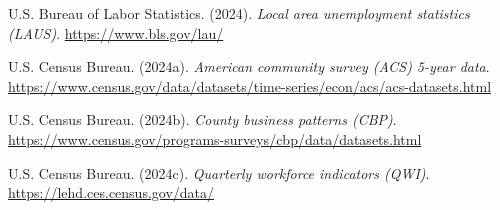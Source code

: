 \documentclass[
]{article}
\newlength{\cslhangindent}
\newenvironment{CSLReferences}[2] %
 {\begin{list}{}{%
  \setlength{\itemindent}{0pt}
  \setlength{\leftmargin}{0pt}
  \setlength{\parsep}{0pt}
  \ifodd #1
   \setlength{\leftmargin}{\cslhangindent}
   \setlength{\itemindent}{-1\cslhangindent}
  \fi
  \setlength{\itemsep}{#2\baselineskip}}}
 {\end{list}}
\begin{document}
\begin{CSLReferences}{1}{0}
U.S. Bureau of Labor Statistics. (2024). \emph{Local area unemployment
statistics (LAUS)}. \url{https://www.bls.gov/lau/}

U.S. Census Bureau. (2024a). \emph{American community survey (ACS)
5-year data}.
\url{https://www.census.gov/data/datasets/time-series/econ/acs/acs-datasets.html}

U.S. Census Bureau. (2024b). \emph{County business patterns (CBP)}.
\url{https://www.census.gov/programs-surveys/cbp/data/datasets.html}

U.S. Census Bureau. (2024c). \emph{Quarterly workforce indicators
(QWI)}. \url{https://lehd.ces.census.gov/data/}

\end{CSLReferences}
\end{document}
